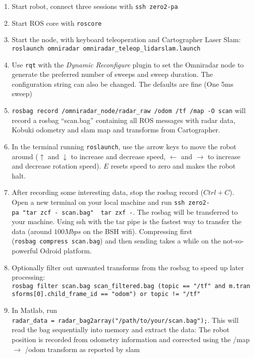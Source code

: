 \begin{enumerate}
\def\labelenumi{\arabic{enumi}.}
\tightlist
\item
  Start robot, connect three sessions with \texttt{ssh\ zero2-pa}
\item
  Start ROS core with \texttt{roscore}
\item
  Start the node, with keyboard teleoperation and Cartographer Laser
  Slam:
  \texttt{roslaunch\ omniradar\ omniradar\_teleop\_lidarslam.launch}
\item
  Use \texttt{rqt} with the \emph{Dynamic Reconfigure} plugin to set the
  Omniradar node to generate the preferred number of sweeps and sweep
  duration. The configuration string can also be changed. The defaults
  are fine (One 5ms sweep)
\item
  \texttt{rosbag\ record\ /omniradar\_node/radar\_raw\ /odom\ /tf\ /map\ -O\ scan}
  will record a rosbag ``scan.bag'' containing all ROS messages with
  radar data, Kobuki odometry and slam map and transforms from
  Cartographer.
\item
  In the terminal running \texttt{roslaunch}, use the arrow keys to move
  the robot around (\(\uparrow\) and \(\downarrow\) to increase and
  decrease speed, \(\leftarrow\) and \(\rightarrow\) to increase and
  decrease rotation speed). \(E\) resets speed to zero and makes the
  robot halt.
\item
  After recording some interesting data, stop the rosbag record
  (\(Ctrl+C\)). Open a new terminal on your local machine and run
  \texttt{ssh\ zero2-pa\ "tar\ zcf\ -\ scan.bag"\ \textbar{}\ tar\ zxf\ -}.
  The rosbag will be transferred to your machine. Using ssh with the tar
  pipe is the fastest way to transfer the data (around \(100 Mbps\) on
  the BSH wifi). Compressing first (\texttt{rosbag\ compress\ scan.bag})
  and then sending takes a while on the not-so-powerful Odroid platform.
\item
  Optionally filter out unwanted transforms from the rosbag to speed up
  later processing:
  \texttt{rosbag\ filter\ scan.bag\ scan\_filtered.bag\ \textquotesingle{}(topic\ ==\ "/tf"\ and\ m.transforms{[}0{]}.child\_frame\_id\ ==\ "odom")\ or\ topic\ !=\ "/tf"\textquotesingle{}}
\item
  In Matlab, run
  \texttt{radar\_data\ =\ radar\_bag2array("/path/to/your/scan.bag");}.
  This will read the bag sequentially into memory and extract the data:
  The robot position is recorded from odometry information and corrected
  using the /map \(\rightarrow\) /odom transform as reported by slam

\end{enumerate}
